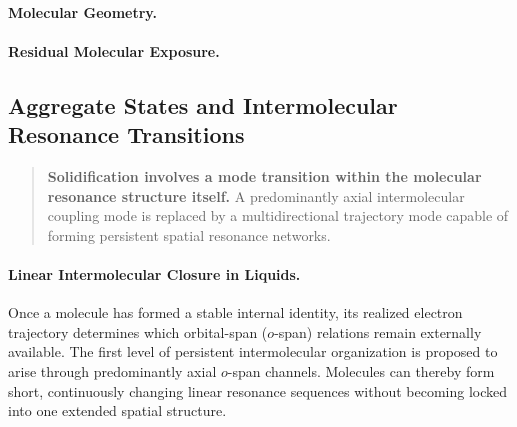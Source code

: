 \documentclass[11pt,a4paper]{article}
\begin{document}


\paragraph{Molecular Geometry.}

\paragraph{Residual Molecular Exposure.}



\subsection{Aggregate States and Intermolecular Resonance Transitions}

\begin{quote}\textbf{Solidification involves a mode transition within the molecular resonance structure itself.}
A predominantly axial intermolecular coupling mode is replaced by a multidirectional trajectory mode capable of forming persistent spatial resonance networks.\end{quote}

\paragraph{Linear Intermolecular Closure in Liquids.}
Once a molecule has formed a stable internal identity, its realized electron trajectory determines which orbital-span (\(o\)-span) relations remain externally available. The first level of persistent intermolecular organization is proposed to arise through predominantly axial \(o\)-span channels. Molecules can thereby form short, continuously changing linear resonance sequences without becoming locked into one extended spatial structure.
\end{document}
